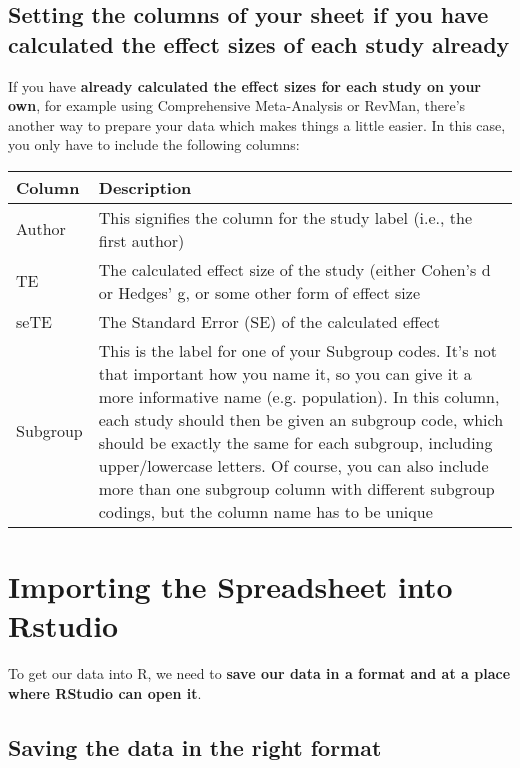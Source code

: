 \documentclass[]{book}
\theoremstyle{definition}
\theoremstyle{definition}
\theoremstyle{definition}
\theoremstyle{remark}
\begin{document}
\subsection{Setting the columns of your sheet if you have calculated the
effect sizes of each study
already}\label{setting-the-columns-of-your-sheet-if-you-have-calculated-the-effect-sizes-of-each-study-already}

If you have \textbf{already calculated the effect sizes for each study
on your own}, for example using Comprehensive Meta-Analysis or RevMan,
there's another way to prepare your data which makes things a little
easier. In this case, you only have to include the following columns:

\begin{tabular}{l|l}
\hline
Column & Description\\
\hline
Author & This signifies the column for the study label (i.e., the first author)\\
\hline
TE & The calculated effect size of the study (either Cohen's d or Hedges' g, or some other form of effect size\\
\hline
seTE & The Standard Error (SE) of the calculated effect\\
\hline
Subgroup & This is the label for one of your Subgroup codes. It's not that important how you name it, so you can give it a more informative name (e.g. population). In this column, each study should then be given an subgroup code, which should be exactly the same for each subgroup, including upper/lowercase letters. Of course, you can also include more than one subgroup column with different subgroup codings, but the column name has to be unique\\
\hline
\end{tabular}

\hypertarget{import_excel}{\section{Importing the Spreadsheet into
Rstudio}\label{import_excel}}

To get our data into R, we need to \textbf{save our data in a format and
at a place where RStudio can open it}.

\subsection{Saving the data in the right
format}\label{saving-the-data-in-the-right-format}
\end{document}
